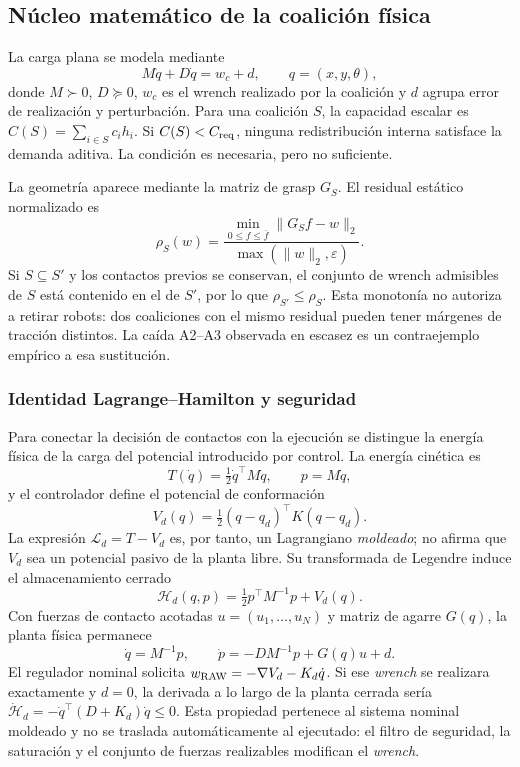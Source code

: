 \subsection{Núcleo matemático de la coalición física}
\label{sec:nucleo-matematico-coalicion}

La carga plana se modela mediante
\[
 M\ddot q+D\dot q=w_c+d,
 \qquad q=(x,y,\theta),
\]
donde $M\succ0$, $D\succeq0$, $w_c$ es el wrench realizado por la coalición y $d$ agrupa error de realización y perturbación. Para una coalición $S$, la capacidad escalar es $C(S)=\sum_{i\in S}c_ih_i$. Si $C(S)<C_{\rm req}$, ninguna redistribución interna satisface la demanda aditiva. La condición es necesaria, pero no suficiente.

La geometría aparece mediante la matriz de grasp $G_S$. El residual estático normalizado es
\[
 \rho_S(w)=
 \frac{\min_{0\leq f\leq\bar f}\lVert G_Sf-w\rVert_2}
 {\max(\lVert w\rVert_2,\varepsilon)}.
\]
Si $S\subseteq S'$ y los contactos previos se conservan, el conjunto de wrench admisibles de $S$ está contenido en el de $S'$, por lo que $\rho_{S'}\leq\rho_S$. Esta monotonía no autoriza a retirar robots: dos coaliciones con el mismo residual pueden tener márgenes de tracción distintos. La caída A2--A3 observada en escasez es un contraejemplo empírico a esa sustitución.

\subsubsection{Identidad Lagrange--Hamilton y seguridad}

Para conectar la decisi\'on de contactos con la ejecuci\'on se distingue la energ\'ia f\'isica de la carga del potencial introducido por control. La energ\'ia cin\'etica es
\[
  T(\dot q)=\tfrac12\dot q^\top M\dot q,
  \qquad p=M\dot q,
\]
y el controlador define el potencial de conformaci\'on
\[
  V_d(q)=\tfrac12(q-q_d)^\top K(q-q_d).
\]
La expresi\'on $\mathcal L_d=T-V_d$ es, por tanto, un Lagrangiano \emph{moldeado}; no afirma que $V_d$ sea un potencial pasivo de la planta libre. Su transformada de Legendre induce el almacenamiento cerrado
\[
  \mathcal H_d(q,p)=\tfrac12p^\top M^{-1}p+V_d(q).
\]
Con fuerzas de contacto acotadas $u=(u_1,\ldots,u_N)$ y matriz de agarre
$G(q)$, la planta f\'isica permanece
\[
 \dot q=M^{-1}p,\qquad
 \dot p=-D M^{-1}p+G(q)u+d.
\]
El regulador nominal solicita
$w_{\rm RAW}=-\nabla V_d-K_d\dot q$. Si ese \emph{wrench} se realizara exactamente y $d=0$, la derivada a lo largo de la planta cerrada ser\'ia
$\dot{\mathcal H}_d=-\dot q^\top(D+K_d)\dot q\leq0$. Esta propiedad pertenece al sistema nominal moldeado y no se traslada autom\'aticamente al ejecutado: el filtro de seguridad, la saturaci\'on y el conjunto de fuerzas realizables modifican el \emph{wrench}.

